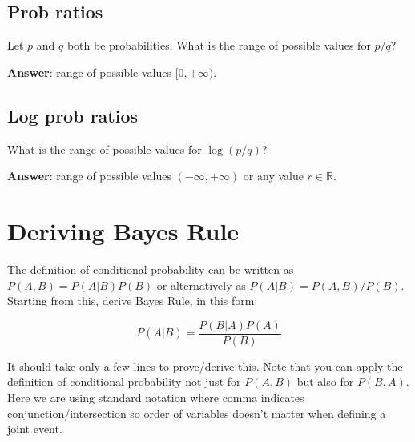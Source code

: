 \documentclass[11pt,letterpaper]{article}
\theoremstyle{definition}
\begin{document}
\subsection{Prob ratios}
Let $p$ and $q$ both be probabilities.
What is the range of possible values for $p/q$?

\textbf{Answer}: range of possible values  $[0,+\infty)$. 

\subsection{Log prob ratios}
What is the range of possible values for $\log(p/q)$?

\textbf{Answer}: range of possible values  $(-\infty,+\infty)$ or any value $r \in \mathbb{R}$.

%
%
%

%
%

\section{Deriving Bayes Rule}

The definition of conditional probability can be written as $P(A,B) = P(A|B)P(B)$ or alternatively as $P(A|B) = P(A,B)/P(B)$.
Starting from this, derive Bayes Rule, in this form:

\[ P(A|B) = \frac{P(B|A) P(A)}{P(B)} \]

\noindent
It should take only a few lines to prove/derive this.  Note that you can apply the definition of conditional probability not just for $P(A,B)$ but also for $P(B,A)$.  Here we are using standard notation where comma indicates conjunction/intersection so order of variables doesn't matter when defining a joint event.
\end{document}
